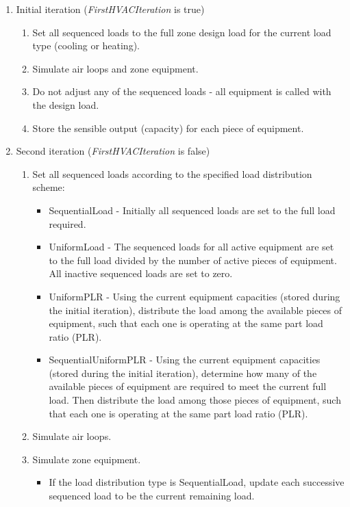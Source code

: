 \begin{enumerate}
\item
  Initial iteration (\emph{FirstHVACIteration} is true)
  \begin{enumerate}
  \item
    Set all sequenced loads to the full zone design load for the current load type (cooling or heating).
  \item
    Simulate air loops and zone equipment.
  \item
    Do not adjust any of the sequenced loads - all equipment is called with the design load.
  \item
    Store the sensible output (capacity) for each piece of equipment.
  \end{enumerate}
\item
  Second iteration (\emph{FirstHVACIteration} is false)
  \begin{enumerate}
  \item
    Set all sequenced loads according to the specified load distribution scheme:
    \begin{itemize}
    \item
      SequentialLoad - Initially all sequenced loads are set to the full load required.
    \item
      UniformLoad - The sequenced loads for all active equipment are set to the full load divided by the number of active pieces of equipment. All inactive sequenced loads are set to zero.
    \item
      UniformPLR - Using the current equipment capacities (stored during the initial iteration), distribute the load among the available pieces of equipment, such that each one is operating at the same part load ratio (PLR).
    \item
      SequentialUniformPLR - Using the current equipment capacities (stored during the initial iteration), determine how many of the available pieces of equipment are required to meet the current full load.  Then distribute the load among those pieces of equipment, such that each one is operating at the same part load ratio (PLR).
    \end{itemize}
  \item
    Simulate air loops.
  \item
    Simulate zone equipment.
    \begin{itemize}
    \item
      If the load distribution type is SequentialLoad, update each successive sequenced load to be the current remaining load.

\end{itemize}
\end{enumerate}
\end{enumerate}
